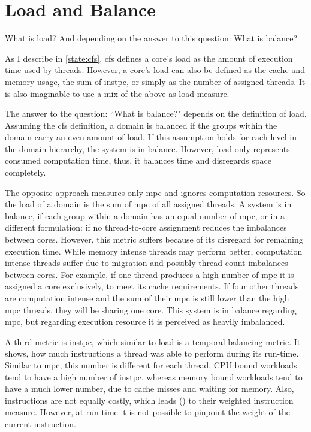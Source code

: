 \section{Load and Balance}
\label{design:load}


What is load?
And depending on the answer to this question: What is balance?

As I describe in \ref{state:cfs}, \gls{cfs} defines a core's load as the amount of
execution time used by threads.
However, a core's load can also be defined as
the cache and memory usage, the sum of \gls{instpc}, or simply as the number of
assigned threads.
It is also imaginable to use a mix of the above as load measure.

The answer to the question: ``What is balance?" depends on the definition of
load.
Assuming the \gls{cfs} definition, a domain is balanced if the groups within
the domain carry an even amount of load.
If this assumption holds for each level in the domain hierarchy, the system is
in balance.
However, load only represents consumed computation time, thus, it balances time
and disregards space completely.

The opposite approach measures only \gls{mpc} and ignores computation
resources.
So the load of a domain is the sum of \gls{mpc} of all assigned threads.
A system is in balance, if each group within a domain has an equal number of
\gls{mpc}, or in a different formulation:
if no thread-to-core assignment reduces the imbalances between cores.
However, this metric suffers because of its disregard for remaining execution time.
While memory intense threads may perform better, computation intense threads
suffer due to migration and possibly thread count imbalances between
cores.
For example, if one thread produces a high number of \gls{mpc} it is assigned a
core exclusively, to meet its cache requirements.
If four other threads are computation intense and the sum of their \gls{mpc} is
still lower than the high \gls{mpc} threads, they will be sharing one core.
This system is in balance regarding \gls{mpc}, but regarding execution resource
it is perceived as heavily imbalanced.

A third metric is \gls{instpc}, which similar to load is a temporal balancing
metric.
It shows, how much instructions a thread was able to perform during its
run-time.
Similar to \gls{mpc}, this number is different for each thread.
CPU bound workloads tend to have a high number of \gls{instpc},
whereas memory bound workloads tend to have a much lower number, due to cache
misses and waiting for memory.
Also, instructions are not equally costly, which leads
\citeauthor{snavely_symbiotic_2000} (\cite{snavely_symbiotic_2000}) to their
weighted instruction measure.
However, at run-time it is not possible to pinpoint the weight of the current
instruction.

